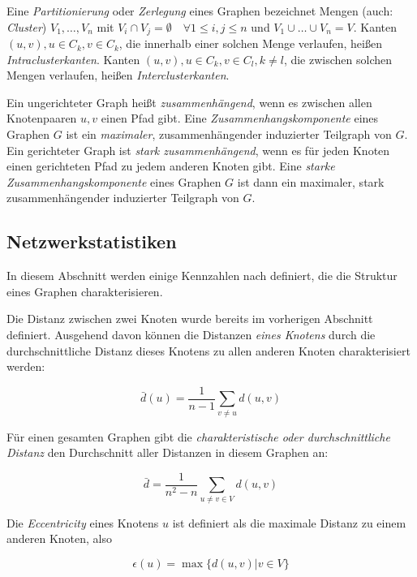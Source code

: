 Eine \emph{Partitionierung} oder \emph{Zerlegung} eines Graphen
bezeichnet Mengen (auch: \emph{Cluster}) $V_1, \dots, V_n$ mit $V_i
\cap V_j = \emptyset \quad \forall 1 \le i, j \le n$ und $V_1 \cup
\dots \cup V_n = V$. Kanten $(u, v), u \in C_k, v \in C_k$, die
innerhalb einer solchen Menge verlaufen, heißen
\emph{Intraclusterkanten}. Kanten $(u, v), u \in C_k, v \in C_l, k \ne
l$, die zwischen solchen Mengen verlaufen, heißen
\emph{Interclusterkanten}.

Ein ungerichteter Graph heißt \emph{zusammenhängend}, wenn es
zwischen allen Knotenpaaren $u, v$ einen Pfad gibt. Eine
\emph{Zusammenhangskomponente} eines Graphen $G$ ist ein
\emph{maximaler}, zusammenhängender induzierter Teilgraph von
$G$. Ein gerichteter Graph ist \emph{stark zusammenhängend}, wenn es
für jeden Knoten einen gerichteten Pfad zu jedem anderen Knoten gibt. Eine
\emph{starke Zusammenhangskomponente} eines Graphen $G$ ist dann ein
maximaler, stark zusammenhängender induzierter Teilgraph von $G$.

\subsection{Netzwerkstatistiken}
\label{ch:Grundlagen:sec:Netzwerkanalyse:subsec:Statistiken}

In diesem Abschnitt werden einige Kennzahlen nach
\cite{Brinkmeier2004} definiert, die die Struktur eines Graphen
charakterisieren.

Die Distanz zwischen zwei Knoten wurde bereits im vorherigen Abschnitt
definiert. Ausgehend davon können die Distanzen \emph{eines Knotens}
durch die durchschnittliche Distanz dieses Knotens zu allen anderen
Knoten charakterisiert werden:

\begin{equation}
  \label{eq:1}
  \bar{d}(u) = \frac{1}{n-1} \sum_{v \ne u} d(u, v)
\end{equation}

Für einen gesamten Graphen gibt die \emph{charakteristische oder
  durchschnittliche Distanz} den Durchschnitt aller Distanzen in
diesem Graphen an:

\begin{equation}
  \label{eq:2}
  \bar{d} = \frac{1}{n^2 - n} \sum_{u \ne v \in V} d(u, v)
\end{equation}

Die \emph{Eccentricity} eines Knotens $u$ ist definiert als die
maximale Distanz zu einem anderen Knoten, also

\begin{equation}
  \label{eq:3}
  \epsilon(u) = \max\{d(u,v) | v \in V\}
\end{equation}

